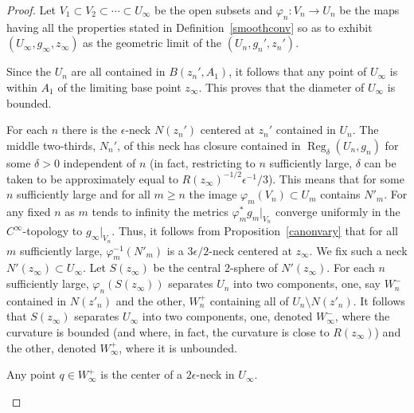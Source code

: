 \begin{proof}
Let $V_1\subset V_2 \subset \cdots \subset U_\infty$ be the open
subsets and $\varphi_n\colon V_n\to U_n$ be the maps having all the
properties stated in Definition~\ref{smoothconv} so as to exhibit
$(U_\infty,g_\infty,z_\infty)$ as the  geometric limit of the
$(U_n,g_n',z_n')$.

Since the $U_n$ are all contained in $B(z_n',A_1)$, it follows that any point
of $U_\infty$ is within $A_1$ of the limiting base point $z_\infty$. This
proves that the diameter of $U_\infty$ is bounded.




For each $n$ there is the  $\epsilon$-neck $N(z_n')$ centered at
$z_n'$ contained in $U_n$. The middle two-thirds, $N_n'$, of this
neck has closure contained in $\operatorname{Reg}_\delta(U_n,g_n)$ for some
$\delta>0$ independent of $n$ (in fact, restricting to $n$
sufficiently large, $\delta$ can be taken to be approximately equal
to $R(z_\infty)^{-1/2}\epsilon^{-1}/3$). This means that for some
$n$ sufficiently large and for all $m\ge n$ the image
$\varphi_m(V_n)\subset U_m$ contains $N'_m$. For any fixed $n$ as
$m$ tends to infinity  the metrics $\varphi_m^*g_m|_{V_n}$ converge
uniformly in the $C^\infty$-topology to $g_\infty|_{V_n}$. Thus, it
follows from Proposition~\ref{canonvary} that for all $m$
sufficiently large, $\varphi^{-1}_m(N'_m)$ is a $3\epsilon/2$-neck
centered at $z_\infty$. We fix such a neck $N'(z_\infty)\subset
U_\infty$. Let $S(z_\infty)$ be the central $2$-sphere of
$N'(z_\infty)$. For each $n$ sufficiently large,
$\varphi_n(S(z_\infty))$ separates $U_n$ into two components, one,
say $W^-_n$ contained in $N(z'_n)$ and the other, $W^+_n$ containing
all of $U_n\setminus N(z'_n)$. It follows that $S(z_\infty)$
separates $U_\infty$ into two components, one, denoted $W^-_\infty$,
where the curvature is bounded (and where, in fact, the curvature is
close to $R(z_\infty)$) and the other, denoted $W^+_\infty$, where
it is unbounded.

\begin{claim}
\label{claim:points-in-Wplus-are-neck-centers}
Any point $q\in W^+_\infty$ is the center of a $2\epsilon$-neck in
$U_\infty$.
\end{claim}


\end{proof}
